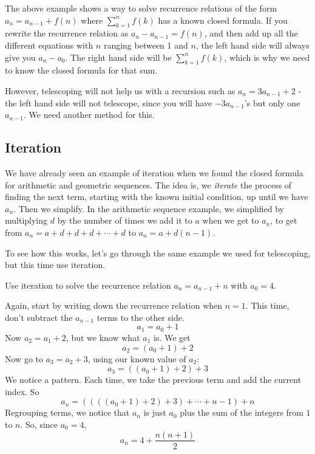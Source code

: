 \documentclass[12pt]{article}
\begin{document}
The above example shows a way to solve recurrence relations of the form $a_n = a_{n-1} + f(n)$ where $\sum_{k = 1}^n f(k)$ has a known closed formula.  If you rewrite the recurrence relation as $a_n - a_{n-1} = f(n)$, and then add up all the different equations with $n$ ranging between 1 and $n$, the left hand side will always give you $a_n - a_0$.  The right hand side will be $\sum_{k = 1}^n f(k)$, which is why we need to know the closed formula for that sum.

However, telescoping will not help us with a recursion such as $a_n = 3a_{n-1} + 2$ - the left hand side will not telescope, since you will have $-3a_{n-1}$'s but only one $a_{n-1}$.  We need another method for this.  

\subsection{Iteration}

We have already seen an example of iteration when we found the closed formula for arithmetic and geometric sequences.  The idea is, we {\em iterate} the process of finding the next term, starting with the known initial condition, up until we have $a_n$.  Then we simplify.  In the arithmetic sequence example, we simplified by multiplying $d$ by the number of times we add it to $a$ when we get to $a_n$, to get from $a_n = a + d + d + d + \cdots + d$ to $a_n = a + d(n-1)$.

To see how this works, let's go through the same example we used for telescoping, but this time use iteration.

\begin{example}
  Use iteration to solve the recurrence relation $a_n = a_{n-1} + n$ with $a_0 = 4$.
  
  \begin{solution}
    Again, start by writing down the recurrence relation when $n = 1$.  This time, don't subtract the $a_{n-1}$ terms to the other side.
    \[a_1 = a_0 + 1\]
    Now $a_2 = a_1 + 2$, but we know what $a_1$ is.  We get
    \[a_2 = (a_0 + 1) + 2\]
    Now go to $a_3 = a_2 + 3$, using our known value of $a_2$:
    \[a_3 = ((a_0 + 1) + 2) + 3\]
    We notice a pattern.  Each time, we take the previous term and add the current index.  So
    \[a_n = ((((a_0 + 1) +2)+3)+\cdots + n-1) + n\]
    Regrouping terms, we notice that $a_n$ is just $a_0$ plus the sum of the integers from $1$ to $n$.  So, since $a_0 = 4$, 
    \[a_n = 4 + \frac{n(n+1)}{2}\]
  \end{solution}

\end{example}
\end{document}

